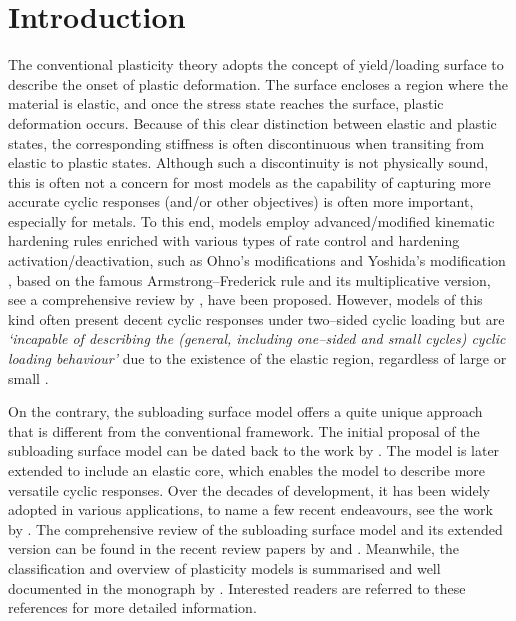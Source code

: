 \section{Introduction}
The conventional plasticity theory adopts the concept of yield/loading surface \citep[see, e.g.,][]{Lemaitre1990,Simo1998} to describe the onset of plastic deformation.
The surface encloses a region where the material is elastic, and once the stress state reaches the surface, plastic deformation occurs.
Because of this clear distinction between elastic and plastic states, the corresponding stiffness is often discontinuous when transiting from elastic to plastic states.
Although such a discontinuity is not physically sound, this is often not a concern for most models as the capability of capturing more accurate cyclic responses (and/or other objectives) is often more important, especially for metals.
To this end, models employ advanced/modified kinematic hardening rules enriched with various types of rate control and hardening activation/deactivation, such as Ohno's modifications \citep[see, e.g.,][]{Ohno1982,Ohno1993,Ohno2021} and Yoshida's modification \citep{Yoshida2002}, based on the famous Armstrong--Frederick rule \citep{Frederick2007} and its multiplicative version, see a comprehensive review by \citet{Chaboche2008}, have been proposed.
However, models of this kind often present decent cyclic responses under two--sided cyclic loading but are \emph{`incapable of describing the \textnormal{(general, including one--sided and small cycles)} cyclic loading behaviour'} \citep[][pg. 282]{Hashiguchi2023} due to the existence of the elastic region, regardless of large or small \citep{Dafalias1977}.

On the contrary, the subloading surface model offers a quite unique approach that is different from the conventional framework.
The initial proposal of the subloading surface model can be dated back to the work by \citet{Hashiguchi1980}.
The model is later extended \citep{Hashiguchi1989} to include an elastic core, which enables the model to describe more versatile cyclic responses.
Over the decades of development, it has been widely adopted in various applications, to name a few recent endeavours, see the work by \citet{Maranha2016,Xiong2018,Anjiki2021,Yamakawa2021,Yamakawa2022,Lu2023}.
The comprehensive review of the subloading surface model and its extended version can be found in the recent review papers by \citet{Hashiguchi2023a} and \citet{Hashiguchi2024}.
Meanwhile, the classification and overview of plasticity models is summarised and well documented in the monograph by \citet[see][\S~10.2]{Hashiguchi2023}.
Interested readers are referred to these references for more detailed information.

